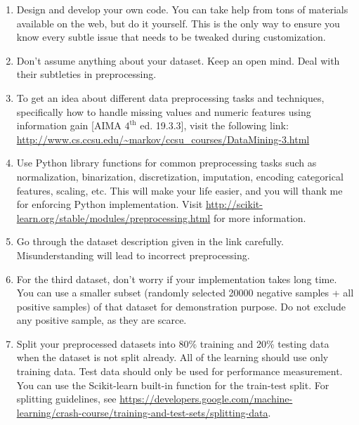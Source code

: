 \documentclass[11pt, a4paper]{article}
\begin{document}
\begin{enumerate}
    \item Design and develop your own code. You can take help from tons of materials available on the web, but do it yourself. This is the only way to ensure you know every subtle issue that needs to be tweaked during customization.
    \item Don't assume anything about your dataset. Keep an open mind. Deal with their subtleties in preprocessing.
    \item To get an idea about different data preprocessing tasks and techniques, specifically how to handle missing values and numeric features using information gain [AIMA $4^{\text{th}}$ ed. 19.3.3], visit the following link: \url{http://www.cs.ccsu.edu/~markov/ccsu_courses/DataMining-3.html}
    \item Use Python library functions for common preprocessing tasks such as normalization, binarization, discretization, imputation, encoding categorical features, scaling, etc. This will make your life easier, and you will thank me for enforcing Python implementation. Visit \url{http://scikit-learn.org/stable/modules/preprocessing.html} for more information.
    \item Go through the dataset description given in the link carefully. Misunderstanding will lead to incorrect preprocessing.
    \item For the third dataset, don't worry if your implementation takes long time. You can use a smaller subset (randomly selected 20000 negative samples + all positive samples) of that dataset for demonstration purpose. Do not exclude any positive sample, as they are scarce.
    \item Split your preprocessed datasets into 80\% training and 20\% testing data when the dataset is not split already. All of the learning should use only training data. Test data should only be used for performance measurement. You can use the Scikit-learn built-in function for the train-test split. For splitting guidelines, see \url{https://developers.google.com/machine-learning/crash-course/training-and-test-sets/splitting-data}.
\end{enumerate}

\end{document}
